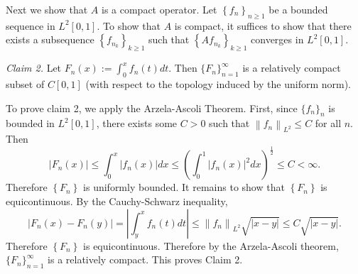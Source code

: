 \documentclass{exam}
\theoremstyle{problemstyle}
\newcommand{\vt}{\vskip 5mm} %
\newcommand{\norm}[1]{\left\lVert#1\right\rVert} %
\newcommand{\1}[1]{\textbf{1}_{\left[#1\right]}} %
\def\({\left (}
\def\){\right )}
\begin{document}
\begin{questions}
\begin{solution}
  Next we show that $A$ is a compact operator. Let $\left\{ f_{n} \right\}_{n\geq 1}$ be a bounded sequence in $L^{2}[0,1]$. To show that $A$ is compact, it suffices to show that there exists a subsequence $\left\{ f_{n_{k}} \right\}_{k\geq 1}$ such that $\left\{ Af_{n_{k}} \right\}_{k\geq 1}$ converges in $L^{2}[0,1]$.

  
  \vt
  \textit{Claim 2.} Let $F_{n}(x):=\int_{0}^{x}f_{n}(t)dt$. Then $\{F_{n}\}_{n=1}^{\infty}$ is a relatively compact subset of $C[0,1]$ (with respect to the topology induced by the uniform norm).

  To prove claim 2, we apply the Arzela-Ascoli Theorem. First, since $\{f_{n}\}_{n}$ is bounded in $L^{2}[0,1]$, there exists some $C>0$ such that $\norm{f_{n}}_{L^{2}}\leq C$ for all $n$. Then
  \begin{equation*}
    |F_{n}(x)| \leq \int_{0}^{x}|f_{n}(x)|dx \leq \(\int_{0}^{1}|f_{n}(x)|^{2}dx \)^{\frac{1}{2}} \leq C <\infty.
  \end{equation*}
  Therefore $\left\{ F_{n} \right\}$ is uniformly bounded. It remains to show that $\left\{ F_{n} \right\}$ is equicontinuous. By the Cauchy-Schwarz inequality,
  \begin{equation*}
    \left| F_{n}(x)-F_{n}(y) \right| = \left| \int_{y}^{x}f_{n}(t)dt \right| \leq \norm{f_{n}}_{L^{2}} \sqrt{|x-y|} \leq C \sqrt{|x-y|}.
  \end{equation*}
  Therefore  $\left\{ F_{n} \right\}$ is equicontinuous. Therefore by the Arzela-Ascoli theorem, $\{F_{n}\}_{n=1}^{\infty}$ is a relatively compact. This proves Claim 2.


\end{solution}
\end{questions}
\end{document}
